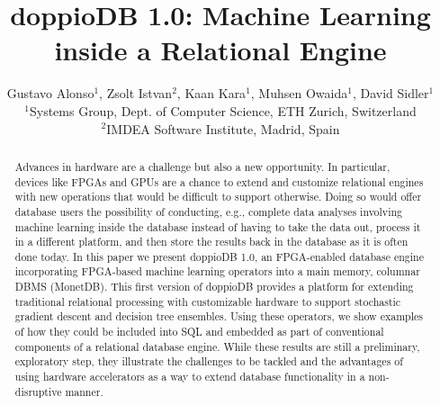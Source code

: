 \documentclass[11pt,dvipdfm]{article}
\begin{document}
\title{doppioDB 1.0: Machine Learning inside a Relational Engine}
\author{Gustavo Alonso\(^1\), Zsolt Istvan\(^2\), Kaan Kara\(^1\), Muhsen Owaida\(^1\), David Sidler\(^1\) \\
\(^1\)Systems Group, Dept. of Computer Science, ETH Zurich, Switzerland \\
\(^2\)IMDEA Software Institute, Madrid, Spain }

\maketitle

\begin{abstract}
   Advances in hardware are a challenge but also a new opportunity. In particular, devices like FPGAs and GPUs are a chance to extend and customize relational engines with new operations that would be difficult to support otherwise. Doing so would offer database users the possibility of conducting, e.g., complete data analyses involving machine learning inside the database instead of having to take the data out, process it in a different platform, and then store the results back in the database as it is often done today. In this paper we present doppioDB 1.0, an FPGA-enabled database engine incorporating FPGA-based machine learning operators into a main memory, columnar DBMS (MonetDB). This first version of doppioDB provides a platform for extending traditional relational processing with customizable hardware to support stochastic gradient descent and decision tree ensembles. Using these operators, we show examples of how they could be included into SQL and embedded as part of conventional components of a relational database engine. While these results are still a preliminary, exploratory step, they illustrate the challenges to be tackled and the advantages of using hardware accelerators as a way to extend database functionality in a non-disruptive manner. 
\end{abstract}

\end{document}
